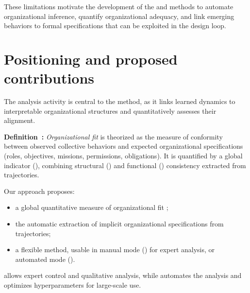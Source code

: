 These limitations motivate the development of the  and  methods to automate organizational inference, quantify organizational adequacy, and link emerging behaviors to formal specifications that can be exploited in the design loop.



\section{Positioning and proposed contributions}
The analysis activity is central to the  method, as it links learned dynamics to interpretable organizational structures and quantitatively assesses their alignment.

\textbf{Definition~:} \textit{Organizational fit} is theorized as the measure of conformity between observed collective behaviors and expected organizational specifications (roles, objectives, missions, permissions, obligations). It is quantified by a global indicator (\textbf{}), combining structural () and functional () consistency extracted from trajectories.

Our approach proposes:
\begin{itemize}
  \item a global quantitative measure of organizational fit ;
  \item the automatic extraction of implicit organizational specifications from trajectories;
  \item a flexible method, usable in manual mode () for expert analysis, or automated mode ().
\end{itemize}

 allows expert control and qualitative analysis, while \textbf{} automates the analysis and optimizes hyperparameters for large-scale use.

